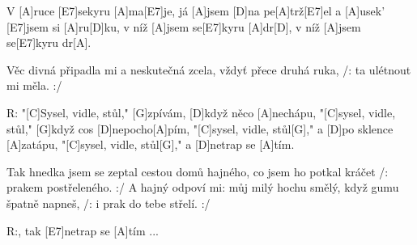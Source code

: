 
V [A]ruce [E7]sekyru [A]ma[E7]je, já [A] jsem [D]na pe[A]trž[E7]el
a [A]usek' [E7]jsem si [A]ru[D]ku, v níž [A]jsem se[E7]kyru [A]dr[D],
v níž [A]jsem se[E7]kyru dr[A].


Věc divná připadla mi a neskutečná zcela,
vždyť přece druhá ruka, /: ta ulétnout mi měla. :/


R: "[C]Sysel, vidle, stůl," [G]zpívám, [D]když něco [A]nechápu,
"[C]sysel, vidle, stůl," [G]když cos [D]nepocho[A]pím,
"[C]sysel, vidle, stůl[G]," a [D]po sklence [A]zatápu,
"[C]sysel, vidle, stůl[G]," a [D]netrap se [A]tím.


Tak hnedka jsem se zeptal cestou domů hajného,
co jsem ho potkal kráčet /: prakem postřeleného. :/
A hajný odpoví mi: můj milý hochu smělý,
když gumu špatně napneš, /: i prak do tebe střelí. :/


R:, tak [E7]netrap se [A]tím ...
